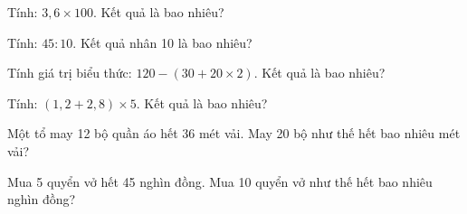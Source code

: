 \begin{ex}
  Tính: $3{,}6 \times 100$. Kết quả là bao nhiêu?
\end{ex}

\begin{ex}
  Tính: $45 : 10$. Kết quả nhân 10 là bao nhiêu?
\end{ex}

\begin{ex}
  Tính giá trị biểu thức: $120 - (30 + 20 \times 2)$. Kết quả là bao nhiêu?
\end{ex}

\begin{ex}
  Tính: $(1{,}2 + 2{,}8) \times 5$. Kết quả là bao nhiêu?
\end{ex}

\begin{ex}
  Một tổ may 12 bộ quần áo hết 36 mét vải. May 20 bộ như thế hết bao nhiêu mét vải?
\end{ex}

\begin{ex}
  Mua 5 quyển vở hết 45 nghìn đồng. Mua 10 quyển vở như thế hết bao nhiêu nghìn đồng?
\end{ex}
